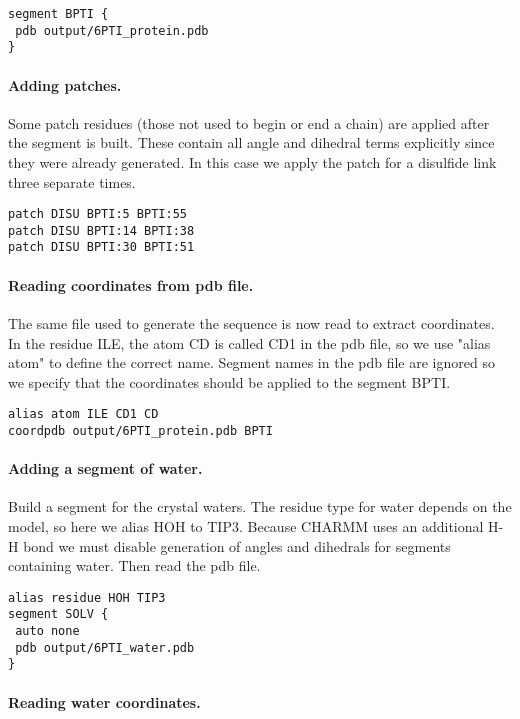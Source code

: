 \begin{verbatim}
segment BPTI {
 pdb output/6PTI_protein.pdb
}
\end{verbatim}

\paragraph*{Adding patches.}


Some patch residues (those not used to begin or end a chain) are
applied after the segment is built.  These contain all angle and
dihedral terms explicitly since they were already generated.  In this
case we apply the patch for a disulfide link three separate times.

\begin{verbatim}
patch DISU BPTI:5 BPTI:55
patch DISU BPTI:14 BPTI:38
patch DISU BPTI:30 BPTI:51
\end{verbatim}

\paragraph*{Reading coordinates from pdb file.}


The same file used to generate the sequence is now read to extract
coordinates.  In the residue ILE, the atom CD is called CD1 in the
pdb file, so we use "alias atom" to define the correct name.  Segment
names in the pdb file are ignored so we specify that the coordinates
should be applied to the segment BPTI.

\begin{verbatim}
alias atom ILE CD1 CD
coordpdb output/6PTI_protein.pdb BPTI
\end{verbatim}

\paragraph*{Adding a segment of water.}


Build a segment for the crystal waters.  The residue type for water
depends on the model, so here we alias HOH to TIP3.  Because CHARMM
uses an additional H-H bond we must disable generation of angles and
dihedrals for segments containing water.  Then read the pdb file.

\begin{verbatim}
alias residue HOH TIP3
segment SOLV {
 auto none
 pdb output/6PTI_water.pdb
}
\end{verbatim}

\paragraph*{Reading water coordinates.}


